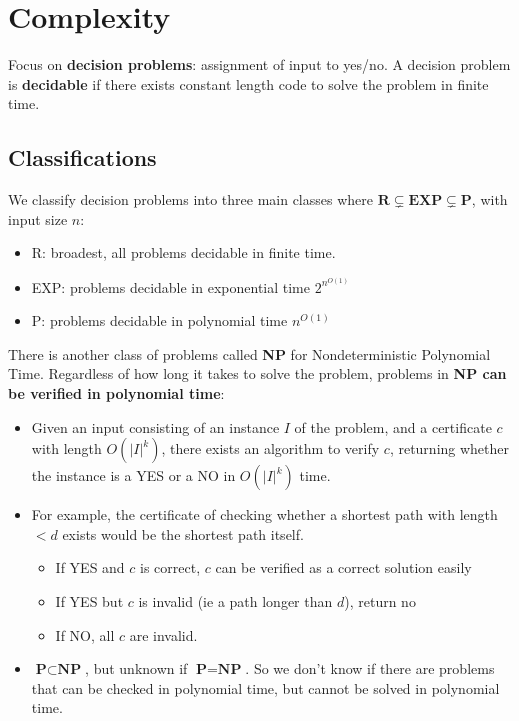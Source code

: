 \documentclass{article}
\begin{document}
\begin{minipage}[t]{0.5\textwidth}
    \section{Complexity}
    Focus on \textbf{decision problems}: assignment of input to yes/no. A decision problem is \textbf{decidable} if there exists constant length code to solve the problem in finite time.
    \subsection{Classifications}
    We classify decision problems into three main classes where $\textbf{R} \subsetneq \textbf{EXP} \subsetneq \textbf{P}$, with input size $n$:
    \begin{itemize}[noitemsep, topsep=0pt]
        \item R: broadest, all problems decidable in finite time.
        \item EXP: problems decidable in exponential time $2^{n^{O(1)}}$
        \item P: problems decidable in polynomial time $n^{O(1)}$
    \end{itemize}

    There is another class of problems called \textbf{NP} for Nondeterministic Polynomial Time. Regardless of how long it takes to solve the problem, problems in \textbf{NP can be verified in polynomial time}:
    \begin{itemize}[topsep=0pt, noitemsep]
        \item Given an input consisting of an instance $I$ of the problem, and a certificate $c$ with length $O(|I|^k)$, there exists an algorithm to verify $c$, returning whether the instance is a YES or a NO in $O(|I|^k)$ time.
        \item For example, the certificate of checking whether a shortest path with length $<d$ exists would be the shortest path itself.
        \begin{itemize}[topsep=0pt, noitemsep]
            \item If YES and $c$ is correct, $c$ can be verified as a correct solution easily
            \item If YES but $c$ is invalid (ie a path longer than $d$), return no
            \item If NO, all $c$ are invalid. 
        \end{itemize}
        \item $\textbf{P} \subset \textbf{NP}$, but unknown if $\textbf{P} = \textbf{NP}$. So we don't know if there are problems that can be checked in polynomial time, but cannot be solved in polynomial time.
    \end{itemize}


\end{minipage}
\end{document}

